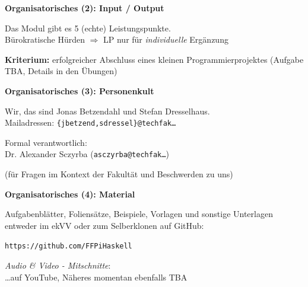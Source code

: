 \documentclass[unknownkeysallowed]{beamer}
\begin{document}
  
  \begin{frame}
    \Large\textbf{Organisatorisches (2): Input / Output}\bigskip \normalsize
    
    Das Modul gibt es 5 (echte) Leistungspunkte.\\
    Bürokratische Hürden $\Rightarrow$ LP nur für \emph{individuelle} Ergänzung \bigskip
    
    \textbf{Kriterium:} erfolgreicher Abschluss eines kleinen Programmierprojektes
    (Aufgabe TBA, Details in den Übungen)
  \end{frame}
  
  
  \begin{frame}
    \Large\textbf{Organisatorisches (3): Personenkult}\bigskip \normalsize

	Wir, das sind Jonas Betzendahl und Stefan Dresselhaus.\\
	Mailadressen: \texttt{\{jbetzend,sdressel\}@techfak\dots}\\ \bigskip
    
    Formal verantwortlich:\\Dr. Alexander Sczyrba (\texttt{asczyrba@techfak\dots})
    
    (für Fragen im Kontext der Fakultät und Beschwerden zu uns)
  \end{frame}
  
  
  \begin{frame}
	\Large\textbf{Organisatorisches (4): Material}\bigskip \normalsize
	
	Aufgabenblätter, Foliensätze, Beispiele, Vorlagen und sonstige Unterlagen entweder im ekVV oder zum Selberklonen auf GitHub:
	
	\bigskip\texttt{https://github.com/FFPiHaskell}\bigskip
	
	\emph{Audio \& Video - Mitschnitte}:\\ \dots auf YouTube, Näheres momentan ebenfalls TBA
  \end{frame}
  
\end{document}
